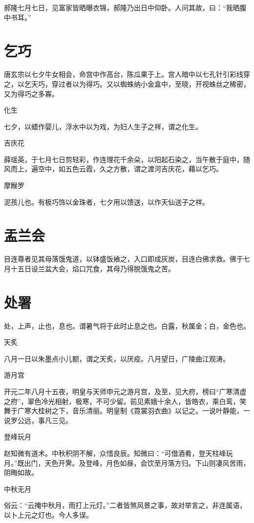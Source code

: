 \documentclass[a4paper,12pt,UTF8,twoside]{ctexbook}
\begin{document}
	郝隆七月七日，见富家皆晒曝衣锦，郝隆乃出日中仰卧。人问其故，曰：“我晒腹中书耳。”
	
	\section{乞巧}
	
	唐玄宗以七夕牛女相会，命宫中作高台，陈瓜果于上。宫人暗中以七孔针引彩线穿之，以乞天巧，穿过者以为得巧。又以蜘蛛纳小金盒中，至晓，开视蛛丝之稀密，又为得巧之多寡。
	
	化生
	
	七夕，以蜡作婴儿，浮水中以为戏，为妇人生子之祥，谓之化生。
	
	吉庆花
	
	薛瑶英，于七月七日剪轻彩，作连理花千余朵，以阳起石染之，当午散于庭中，随风而上，遍空中，如五色云霞，久之方散，谓之渡河吉庆花，藉以乞巧。
	
	摩睺罗
	
	泥孩儿也。有极巧饰以金珠者，七夕用以馈送，以作天仙送子之祥。
	
	\section{盂兰会}
	
	目连尊者见其母落饿鬼道，以钵盛饭飨之，入口即成灰炭，目连白佛求救。佛于七月十五日设兰盆大会，焰口咒食，其母乃得脱饿鬼之苦。
	
	\section{处署}
	
	处，上声，止也，息也。谓暑气将于此时止息之也。白露，秋属金；白，金色也。
	
	天炙
	
	八月一日以朱墨点小儿额，谓之天炙，以厌疫。八月望日，广陵曲江观涛。
	
	游月宫
	
	开元二年八月十五夜，明皇与天师申元之游月宫，及至，见大府，榜曰“广寒清虚之府”，翠色冷光相射，极寒，不可少留。前见素娥十余人，皆皓衣，乘白鸾，笑舞于广寒大桂树之下，音乐清丽。明皇制《霓裳羽衣曲》以记之。一说叶静能，一说罗公远，事凡三见。
	
	登峰玩月
	
	赵知微有道术。中秋积阴不解，众惜良辰。知微曰：“可借酒肴，登天柱峰玩月。”既出门，天色开霁。及登峰，月色如昼，会饮至月落方归。下山则凄风苦雨，阴晦如故。
	
	中秋无月
	
	俗云：“云掩中秋月，雨打上元灯。”二者皆煞风景之事，故对举言之，非连属语，以卜上元之灯也。今人多误。
	
\end{document}
